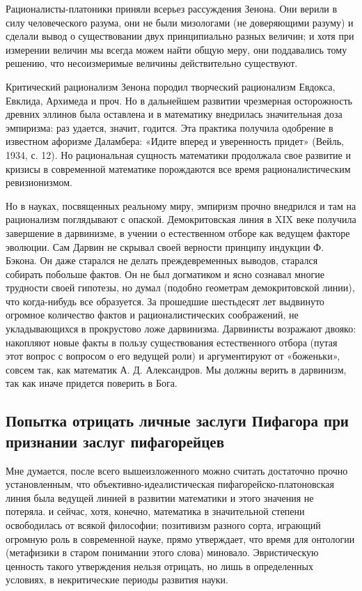 Рационалисты-платоники приняли всерьез рассуждения Зенона. Они верили
в силу человеческого разума, они не были мизологами (не доверяющими
разуму) и сделали вывод о существовании двух принципиально разных
величин; и хотя при измерении величин мы всегда можем найти общую
меру, они поддавались тому решению, что несоизмеримые величины
действительно существуют.

Критический рационализм Зенона породил творческий рационализм Евдокса,
Евклида, Архимеда и проч. Но в дальнейшем развитии чрезмерная
осторожность древних эллинов была оставлена и в математику внедрилась
значительная доза эмпиризма: раз удается, значит, годится. Эта
практика получила одобрение в известном афоризме Даламбера: «Идите
вперед и уверенность придет» (Вейль, 1934, с. 12). Но рациональная
сущность математики продолжала свое развитие и кризисы в современной
математике порождаются все время рационалистическим ревизионизмом.

Но в науках, посвященных реальному миру, эмпиризм прочно внедрился и
там на рационализм поглядывают с опаской. Демокритовская линия в XIX
веке получила завершение в дарвинизме, в учении о естественном отборе
как ведущем факторе эволюции. Сам Дарвин не скрывал своей верности
принципу индукции Ф. Бэкона. Он даже старался не делать
преждевременных выводов, старался собирать побольше фактов. Он не был
догматиком и ясно сознавал многие трудности своей гипотезы, но думал
(подобно геометрам демокритовской линии), что когда-нибудь все
образуется. За прошедшие шестьдесят лет выдвинуто огромное количество
фактов и рационалистических соображений, не укладывающихся в
прокрустово ложе дарвинизма. Дарвинисты возражают двояко: накопляют
новые факты в пользу существования естественного отбора (путая этот
вопрос с вопросом о его ведущей роли) и аргументируют от «боженьки»,
совсем так, как математик А. Д. Александров. Мы должны верить в
дарвинизм, так как иначе придется поверить в Бога.

\subsection{Попытка отрицать личные заслуги Пифагора при признании
заслуг пифагорейцев}

Мне думается, после всего вышеизложенного можно считать достаточно
прочно установленным, что объективно-идеалистическая
пифагорейско-платоновская линия была ведущей линией в развитии
математики и этого значения не потеряла. и сейчас, хотя, конечно,
математика в значительной степени освободилась от всякой философии;
позитивизм разного сорта, играющий огромную роль в современной науке,
прямо утверждает, что время для онтологии (метафизики в старом
понимании этого слова) миновало. Эвристическую ценность такого
утверждения нельзя отрицать, но лишь в определенных условиях, в
некритические периоды развития науки.

